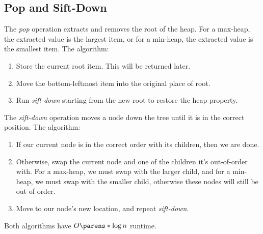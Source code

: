 \subsection{Pop and Sift-Down}

\begin{OpSectionSummary}
    \OpSigSep{}
\end{OpSectionSummary}

The \emph{pop} operation extracts and removes the root of the heap. For a max-heap, the extracted value is the largest item, or for a min-heap, the extracted value is the smallest item. The algorithm:
\begin{enumerate}
    \item Store the current root item. This will be returned later.
    \item Move the bottom-leftmost item into the original place of root.
    \item Run \emph{sift-down} starting from the new root to restore the heap property.
\end{enumerate}

The \emph{sift-down} operation moves a node down the tree until it is in the correct position. The algorithm:
\begin{enumerate}
    \item If our current node is in the correct order with its children, then we are done.
    \item Otherwise, swap the current node and one of the children it's out-of-order with. For a max-heap, we must swap with the larger child, and for a min-heap, we must swap with the smaller child, otherwise these nodes will still be out of order.
    \item Move to our node's new location, and repeat \emph{sift-down}.
\end{enumerate}

Both algorithms have $O \parens*{\log{n}}$ runtime.

